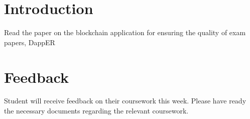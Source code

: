 \documentclass{article}
\begin{document}
\section{Introduction}
Read the paper on the blockchain application for ensuring the quality of exam papers, DappER \cite{mitchell:2019b}

\section{Feedback}
Student will receive feedback on their coursework this week. Please have ready the necessary documents regarding the relevant coursework.
\end{document}
